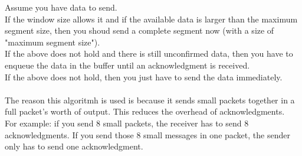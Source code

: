 Assume you have data to send. \\
If the window size allows it and if the available data is larger than the maximum segment size, then you shoud send a complete segment now (with a size of "maximum segment size"). \\
If the above does not hold and there is still unconfirmed data, then you have to enqueue the data in the buffer until an acknowledgment is received. \\
If the above does not hold, then you just have to send the data immediately. \\
 \\
The reason this algoritmh is used is because it sends small packets together in a full packet's worth of output. This reduces the overhead of acknowledgments. \\
For example: if you send 8 small packets, the receiver has to send 8 acknowledgments. If you send those 8 small messages in one packet, the sender only has to send one acknowledgment.